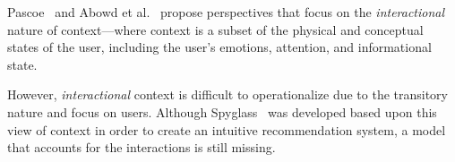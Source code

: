 Pascoe~\citep{Pascoe:1998} and Abowd et al.~\cite{Abowd:1999} propose perspectives that focus on the \textit{interactional} nature of context---where context is a subset of the physical and conceptual states of the user, including the user's emotions, attention, and informational state.


However, \textit{interactional} context is difficult to operationalize due to the transitory nature and focus on users. Although Spyglass~\cite{Viriyakattiyaporn:2010} was developed based upon this view of context in order to create an intuitive recommendation system, a model that accounts for the interactions is still missing.


